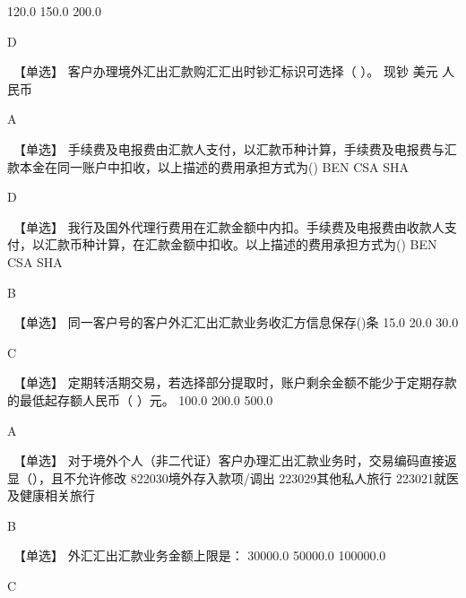 \documentclass[kindlepaper]{BHCexam4kindle}
\begin{document}
\begin{questions}
 {  120.0 } { 150.0 } { 200.0 }
\begin{solution} D \end{solution}
\qs　【单选】 客户办理境外汇出汇款购汇汇出时钞汇标识可选择（ ）。 \xx
{} {  现钞 } { 美元 } { 人民币 }
\begin{solution} A \end{solution}
\qs　【单选】 手续费及电报费由汇款人支付，以汇款币种计算，手续费及电报费与汇款本金在同一账户中扣收，以上描述的费用承担方式为() \xx
{} {  BEN } { CSA } { SHA }
\begin{solution} D \end{solution}
\qs　【单选】 我行及国外代理行费用在汇款金额中内扣。手续费及电报费由收款人支付，以汇款币种计算，在汇款金额中扣收。以上描述的费用承担方式为() \xx
{} {  BEN } { CSA } { SHA }
\begin{solution} B \end{solution}
\qs　【单选】  同一客户号的客户外汇汇出汇款业务收汇方信息保存()条 \xx
{} {  15.0 } { 20.0 } { 30.0 }
\begin{solution} C \end{solution}
\qs　【单选】 定期转活期交易，若选择部分提取时，账户剩余金额不能少于定期存款的最低起存额人民币（ ）元。 \xx
{} {  100.0 } { 200.0 } { 500.0 }
\begin{solution} A \end{solution}
\qs　【单选】 对于境外个人（非二代证）客户办理汇出汇款业务时，交易编码直接返显（），且不允许修改 \xx
{} {  822030境外存入款项/调出 } { 223029其他私人旅行 } { 223021就医及健康相关旅行 }
\begin{solution} B \end{solution}
\qs　【单选】 外汇汇出汇款业务金额上限是： \xx
{} {  30000.0 } { 50000.0 } { 100000.0 }
\begin{solution} C \end{solution}

\end{questions}
\end{document}
